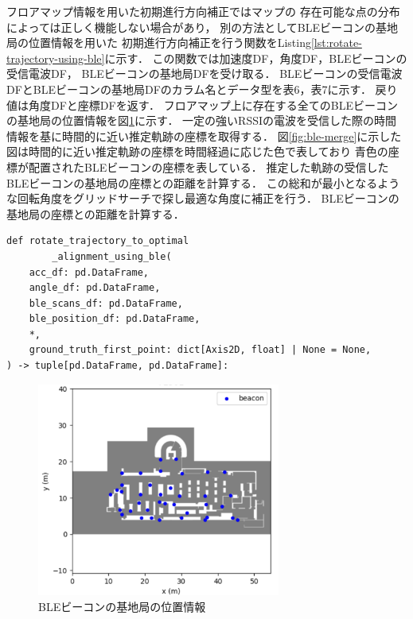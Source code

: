 フロアマップ情報を用いた初期進行方向補正ではマップの
存在可能な点の分布によっては正しく機能しない場合があり，
別の方法としてBLEビーコンの基地局の位置情報を用いた
初期進行方向補正を行う関数をListing\ref{lst:rotate-trajectory-using-ble}に示す．
この関数では加速度DF，角度DF，BLEビーコンの受信電波DF， BLEビーコンの基地局DFを受け取る．
BLEビーコンの受信電波DFとBLEビーコンの基地局DFのカラム名とデータ型を表6，表7に示す．
戻り値は角度DFと座標DFを返す．
フロアマップ上に存在する全てのBLEビーコンの基地局の位置情報を図\ref{fig:ble-beacon-position}に示す．
一定の強いRSSIの電波を受信した際の時間情報を基に時間的に近い推定軌跡の座標を取得する．
図\ref{fig:ble-merge}に示した図は時間的に近い推定軌跡の座標を時間経過に応じた色で表しており
青色の座標が配置されたBLEビーコンの座標を表している．
推定した軌跡の受信したBLEビーコンの基地局の座標との距離を計算する．
この総和が最小となるような回転角度をグリッドサーチで探し最適な角度に補正を行う．
BLEビーコンの基地局の座標との距離を計算する．

\begin{lstlisting}[caption={BLEビーコンの基地局の位置情報を使用した初期進行方向補正}, label=lst:rotate-trajectory-using-ble]
def rotate_trajectory_to_optimal
		_alignment_using_ble(
    acc_df: pd.DataFrame,
    angle_df: pd.DataFrame,
    ble_scans_df: pd.DataFrame,
    ble_position_df: pd.DataFrame,
    *,
    ground_truth_first_point: dict[Axis2D, float] | None = None,
) -> tuple[pd.DataFrame, pd.DataFrame]:
\end{lstlisting}



\begin{figure}[ht]
	\centering
	\includegraphics[width=80mm]{image/ble-beacon-position.jpg}
	\caption{BLEビーコンの基地局の位置情報}    \label{fig:ble-beacon-position}
\end{figure}


